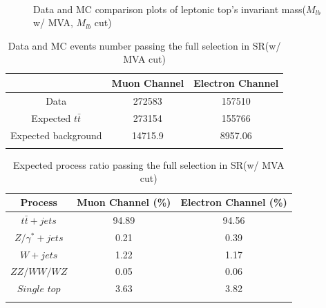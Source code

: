 		\begin{figure}[H]
		\centering
			\\
		\caption{Data and MC comparison plots of leptonic top's invariant mass($M_{lb}$ w/ MVA, $M_{lb}$ cut)}
		\label{EventSelReco:fig:a05_MLP_SR_2C_Mlb}
		\end{figure}
		\FloatBarrier


		\begin{center}
		\begin{longtable}[H]{ c c c }
		\caption{Data and MC events number passing the full selection in SR(w/ MVA cut)} \\
		\hline
		 & Muon Channel & Electron Channel \\ 
		\hline
		 Data & 272583 & 157510 \\
		\hline
		 Expected $t\bar{t}$ & 273154 & 155766 \\
		 Expected background & 14715.9 & 8957.06 \\
		\hline
		\label{EventSelReco:tb:DataMC_expected_a05_MLP_1C}
		\end{longtable}
		\end{center}
		\FloatBarrier

		\begin{center}
		\begin{longtable}[H]{ c c c }
		\caption{Expected process ratio passing the full selection in SR(w/ MVA cut)}\\
		\hline
		 Process & Muon Channel (\%) & Electron Channel (\%) \\ 
		\hline
		 $t\bar{t}+jets$ & 94.89 & 94.56 \\
		 $Z/\gamma^{*}+jets$ & 0.21 &  0.39 \\
		 $W+jets$ & 1.22 & 1.17 \\
		 $ZZ/WW/WZ$ & 0.05 & 0.06 \\
		 $Single$ $top$ & 3.63 & 3.82 \\
		\hline
		\label{EventSelReco:tb:MC_process_a05_MLP_1C}
		\end{longtable}
		\end{center}
		\FloatBarrier


